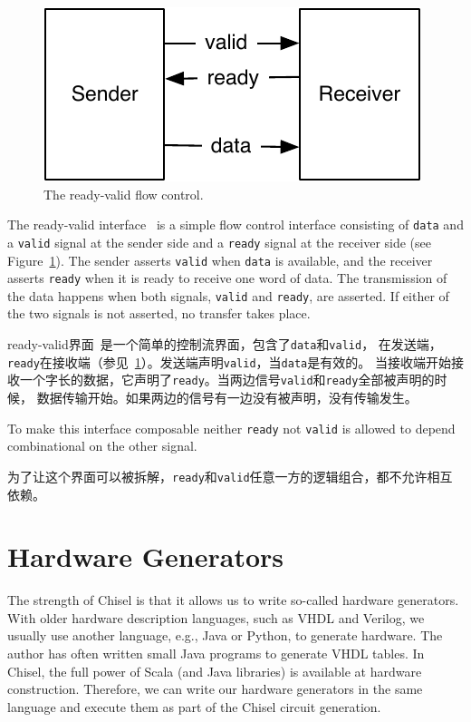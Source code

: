 \documentclass[%
    10pt,
    headinclude, footexclude,
    openright, %
    notitlepage,
    cleardoubleempty,
    headsepline,
    pointlessnumbers,
    bibtotoc, idxtotoc,
    ]{scrbook}
\newcommand{\code}[1]{{\small{\texttt{#1}}}}
\newcommand{\scale}{0.7}
\newcommand{\todo}[1]{{\emph{TODO: #1}}}
\renewcommand{\todo}[1]{}
\begin{document}
{\begin{figure}
  \centering
  \includegraphics[scale=\scale]{figures/readyvalid}
  \caption{The ready-valid flow control.}
  \label{fig:readyvalid}
\end{figure}

The ready-valid interface~\cite[p.~480]{dally:vhdl:2016} is a simple flow
control interface consisting of \code{data} and a \code{valid} signal at the
sender side and a \code{ready} signal at the receiver side (see
Figure~\ref{fig:readyvalid}). The sender asserts \code{valid} when \code{data} is available,
and the receiver asserts \code{ready} when it is ready to receive one word
of data. The transmission of the data happens when both signals, \code{valid}
and \code{ready}, are asserted. If either of the two signals is not asserted,
no transfer takes place.

ready-valid界面~\cite[p.~480]{dally:vhdl:2016}是一个简单的控制流界面，包含了\code{data}和\code{valid}，
在发送端，\code{ready}在接收端（参见~\ref{fig:readyvalid}）。发送端声明\code{valid}，当\code{data}是有效的。
当接收端开始接收一个字长的数据，它声明了\code{ready}。当两边信号\code{valid}和\code{ready}全部被声明的时候，
数据传输开始。如果两边的信号有一边没有被声明，没有传输发生。

To make this interface composable neither \code{ready} not \code{valid} is
allowed to depend combinational on the other signal.

为了让这个界面可以被拆解，\code{ready}和\code{valid}任意一方的逻辑组合，都不允许相互依赖。

\todo{Read and cite AXI}

\chapter{Hardware Generators}

The strength of Chisel is that it allows us to write so-called hardware generators.
With older hardware description languages, such as VHDL and Verilog,
we usually use another language, e.g., Java or Python, to generate hardware.
The author has often written small Java programs to generate VHDL tables.
In Chisel, the full power of Scala (and Java libraries) is available at hardware
construction. Therefore, we can write our hardware generators in the same
language and execute them as part of the Chisel circuit generation.

}
\end{document}
